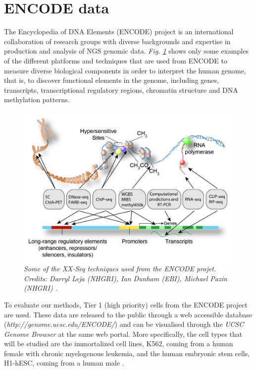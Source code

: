 \section{ENCODE data} \label{encode-data-sect}
The Encyclopedia of DNA Elements (ENCODE) project \citep{Dunham2012} is an international collaboration of research groups with diverse backgrounds and expertise in production and analysis of NGS genomic data. \emph{Fig. \ref{encode-seq-pic}} shows only some examples of the different platforms and techniques that are used from ENCODE to measure diverse biological components in order to interpret the human genome, that is, to discover functional elements in the genome, including genes, transcripts, transcriptional regulatory regions, chromatin structure and DNA methylation patterns.

\begin{figure}[!ht]
\begin{center}
 \includegraphics[scale = 0.24]{images/encode-seq.png}
\caption{\emph{Some of the XX-Seq techniques used from the ENCODE projet. Credits: Darryl Leja (NHGRI), Ian Dunham (EBI), Michael Pazin (NHGRI) \citep{Dunham2012}.}}
\label{encode-seq-pic}
\end{center}
\end{figure} 

To evaluate our methods, Tier 1 (\ie high priority) cells from the ENCODE project are used. These data are released to the public through a web accessible database (\emph{http://genome.ucsc.edu/ENCODE/}) and can be visualised through the \emph{UCSC Genome Browser} at the same web portal. More specifically, the cell types that will be studied are the immortalized cell lines, K562, coming from a human female with chronic myelogenous leukemia, and the human embryonic stem cells, H1-hESC, coming from a human male \citep{Dunham2012}.

